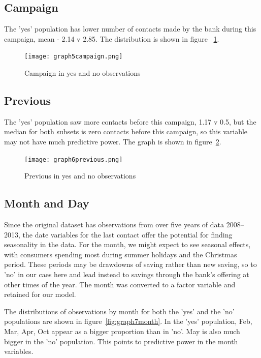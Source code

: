 \documentclass[9pt,technote]{IEEEtran}
\begin{document}
\subsection{Campaign}

The 'yes' population has lower number of contacts made by the bank during this campaign, mean - 2.14 v 2.85.  The distribution is shown in figure ~\ref{fig:graph5campaign}.

\begin{figure}[htbp]
\centerline{\texttt{[image: graph5campaign.png]}}
\caption{Campaign in yes and no observations}
\label{fig:graph5campaign}
\end{figure}

\subsection{Previous}

The 'yes' population saw more contacts before this campaign, 1.17 v 0.5, but the median for both subsets is zero contacts before this campaign, so this variable may not have much predictive power. The graph is shown in figure~\ref{fig:graph6previous}.  

\begin{figure}[htbp]
\centerline{\texttt{[image: graph6previous.png]}}
\caption{Previous in yes and no observations}
\label{fig:graph6previous}
\end{figure}

\subsection{Month and Day}

Since the original dataset has observations from over five years of data 2008--2013, the date variables for the last contact offer the potential for finding seasonality in the data.  For the month, we might expect to see seasonal effects, with consumers spending most during summer holidays and the Christmas period.   These periods may be drawdowns of saving rather than new saving, so to 'no' in our caes here and lead instead to savings through the bank's offering at other times of the year.  The month was converted to a factor variable and retained for our model.  

The distributions of observations by month for both the 'yes' and the 'no' populations are shown in 
figure~\ref{fig:graph7month}.  In the 'yes' population, Feb, Mar, Apr, Oct appear as a bigger proportion than in 'no'.  May is also much bigger in the 'no' population.  This points to predictive power in the month variables.  
\end{document}
